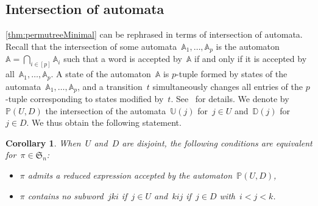 \documentclass{amsart}
\newtheorem{corollary}[theorem]{Corollary}
\newcommand{\fS}{\mathfrak{S}} %
\newcommand{\automatonA}{\mathbb{A}} %
\newcommand{\automatonP}{\mathbb{P}} %
\newcommand{\automatonU}{\mathbb{U}} %
\newcommand{\automatonD}{\mathbb{D}} %
\begin{document}
\subsection{Intersection of automata}

\cref{thm:permutreeMinimal} can be rephrased in terms of intersection of automata.
Recall that the intersection of some automata~$\automatonA_1, \dots, \automatonA_p$ is the automaton~$\automatonA = \bigcap_{i \in [p]} \automatonA_i$ such that a word is accepted by~$\automatonA$ if and only if it is accepted by all~$\automatonA_1, \dots, \automatonA_p$.
A state of the automaton~$\automatonA$ is $p$-tuple formed by states of the automata~$\automatonA_1, \dots, \automatonA_p$, and a transition~$t$ simultaneously changes all entries of the $p$-tuple corresponding to states modified by~$t$.
See~\cite[p.\,59--60]{HopcroftUllman} for details.
We denote by~$\automatonP(U,D)$ the intersection of the automata~$\automatonU(j)$ for~$j \in U$ and~$\automatonD(j)$ for~$j \in D$.
We thus obtain the following statement.

\begin{corollary}
\label{coro:permutreeMinimal}
When~$U$ and~$D$ are disjoint, the following conditions are equivalent for~$\pi \in \fS_n$:
\begin{itemize}
	\item $\pi$ admits a reduced expression accepted by the automaton~$\automatonP(U,D)$,
	\item $\pi$ contains no subword~$jki$ if~$j \in U$ and~$kij$ if~$j \in D$ with~$i < j < k$.
\end{itemize}
\end{corollary}
\end{document}
